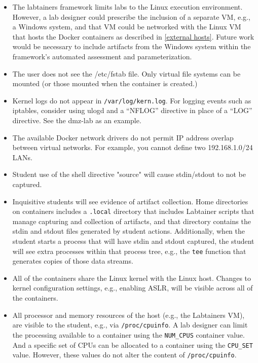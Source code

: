 \documentclass[12pt]{article}
\begin{document}
\begin{itemize}
\item The labtainers framework limits labs to the Linux execution environment.
However, a lab designer could prescribe the inclusion of a separate
VM, e.g., a Windows system, and that VM could be networked with the Linux
VM that hosts the Docker containers as described in \ref{external hosts}.  
Future work would be necessary to include
artifacts from the Windows system within the framework's automated assessment
and parameterization.

\item The user does not see the /etc/fstab file.  Only virtual file systems can be
mounted (or those mounted when the container is created.)

\item Kernel logs do not appear in {\tt /var/log/kern.log}.  For logging events
such as iptables, consider using ulogd and a ``NFLOG'' directive in place of
a ``LOG'' directive.  See the dmz-lab as an example.

\item The available Docker network drivers do not permit IP address overlap between virtual networks.
For example, you cannot define two 192.168.1.0/24 LANs.

\item Student use of the shell directive "source" will cause stdin/stdout to not be captured.

\item Inquisitive students will see evidence of artifact collection.  Home directories
on containers includes a \texttt{.local} directory that includes Labtainer scripts that manage
capturing and collection of artifacts, and that directory contains the stdin and
stdout files generated by student actions. Additionally, when the student starts a process
that will have stdin and stdout captured, the student will see extra processes within
that process tree, e.g., the \texttt{tee} function that generates copies of those data streams.

\item All of the containers share the Linux kernel with the Linux host.  Changes to
kernel configuration settings, e.g., enabling ASLR, will be visible across all
of the containers.

\item All processor and memory resources of the host (e.g., the Labtainers VM),  are visible to the student, e.g., via 
{\tt /proc/cpuinfo}.  A lab designer can limit the processing available to a container using the
{\tt NUM\_CPUS} container value.  And a specific set of CPUs can be allocated to a container using the
{\tt CPU\_SET} value.  However, these values do not alter the content of {\tt /proc/cpuinfo}.
\end{itemize}
\end{document}
